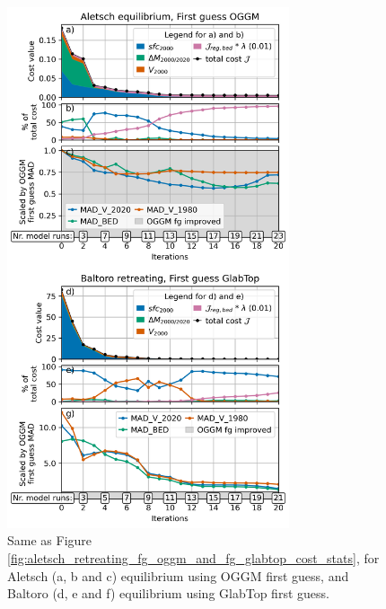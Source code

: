 \documentclass[journal abbreviation, manuscript]{copernicus}
\begin{document}
\begin{figure}
    \centering
    \includegraphics[width=8.3cm]{fig07.png}
    \caption{Same as Figure \ref{fig:aletsch_retreating_fg_oggm_and_fg_glabtop_cost_stats}, for Aletsch (a, b and c) equilibrium using OGGM first guess, and Baltoro (d, e and f) equilibrium using GlabTop first guess.}
    \label{fig:aletsch_eq_fg_oggm_baltoro_ret_fg_glabtop}
\end{figure}
\end{document}
